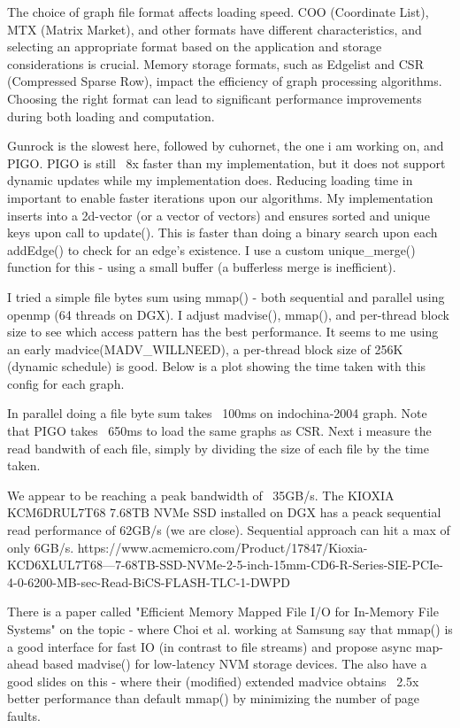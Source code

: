 The choice of graph file format affects loading speed. COO (Coordinate List), MTX (Matrix Market), and other formats have different characteristics, and selecting an appropriate format based on the application and storage considerations is crucial. Memory storage formats, such as Edgelist and CSR (Compressed Sparse Row), impact the efficiency of graph processing algorithms. Choosing the right format can lead to significant performance improvements during both loading and computation.


Gunrock is the slowest here, followed by cuhornet, the one i am working on, and PIGO. PIGO is still ~8x faster than my implementation, but it does not support dynamic updates while my implementation does. Reducing loading time in important to enable faster iterations upon our algorithms.
My implementation inserts into a 2d-vector (or a vector of vectors) and ensures sorted and unique keys upon call to update(). This is faster than doing a binary search upon each addEdge() to check for an edge's existence. I use a custom unique\_merge() function for this - using a small buffer (a bufferless merge is inefficient).

I tried a simple file bytes sum using mmap() - both sequential and parallel using openmp (64 threads on DGX). I adjust madvise(), mmap(), and per-thread block size to see which access pattern has the best performance.
It seems to me using an early madvice(MADV\_WILLNEED), a per-thread block size of 256K (dynamic schedule) is good. Below is a plot showing the time taken with this config for each graph.

In parallel doing a file byte sum takes ~100ms on indochina-2004 graph. Note that PIGO takes ~650ms to load the same graphs as CSR. Next i measure the read bandwith of each file, simply by dividing the size of each file by the time taken.

We appear to be reaching a peak bandwidth of ~35GB/s. The KIOXIA KCM6DRUL7T68 7.68TB NVMe SSD installed on DGX has a peack sequential read performance of 62GB/s (we are close). Sequential approach can hit a max of only 6GB/s.
https://www.acmemicro.com/Product/17847/Kioxia-KCD6XLUL7T68---7-68TB-SSD-NVMe-2-5-inch-15mm-CD6-R-Series-SIE-PCIe-4-0-6200-MB-sec-Read-BiCS-FLASH-TLC-1-DWPD

There is a paper called "Efficient Memory Mapped File I/O for In-Memory File Systems" on the topic - where Choi et al. working at Samsung say that mmap() is a good interface for fast IO (in contrast to file streams) and propose async map-ahead based madvise() for low-latency NVM storage devices. The also have a good slides on this - where their (modified) extended madvice obtains ~2.5x better performance than default mmap() by minimizing the number of page faults.

